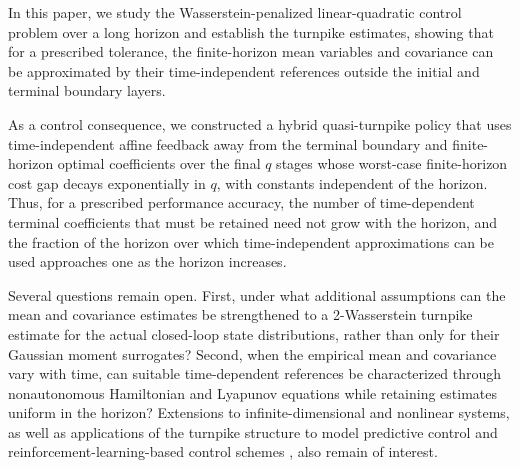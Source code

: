 \documentclass[10pt,journal,twoside]{IEEEtran}
\theoremstyle{definition}
\theoremstyle{remark}
\begin{document}

In this paper, we study the Wasserstein-penalized linear-quadratic control problem over a long horizon and establish the turnpike estimates, showing that for a prescribed tolerance, the finite-horizon mean variables and covariance can be approximated by their time-independent references outside the initial and terminal boundary layers. 

As a control consequence, we constructed a hybrid quasi-turnpike policy that uses time-independent affine feedback away from the terminal boundary and finite-horizon optimal coefficients over the final $q$ stages whose worst-case finite-horizon cost gap decays exponentially in $q$, with constants independent of the horizon. Thus, for a prescribed performance accuracy, the number of time-dependent terminal coefficients that must be retained need not grow with the horizon, and the fraction of the horizon over which time-independent approximations can be used approaches one as the horizon increases. 

Several questions remain open. First, under what additional assumptions can the mean and covariance estimates be strengthened to a 2-Wasserstein turnpike estimate for the actual closed-loop state distributions, rather than only for their Gaussian moment surrogates? Second, when the empirical mean and covariance vary with time, can suitable time-dependent references be characterized through nonautonomous Hamiltonian and Lyapunov equations while retaining estimates uniform in the horizon? Extensions to infinite-dimensional and nonlinear systems, as well as applications of the turnpike structure to model predictive control and reinforcement-learning-based control schemes \cite{Breiten2020,Reiter2025}, also remain of interest.
\end{document}
